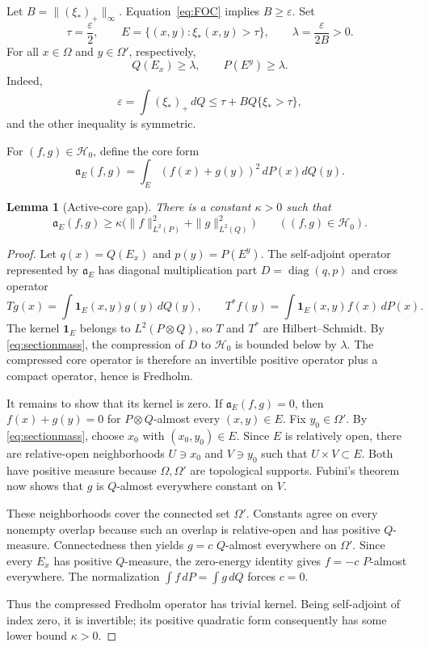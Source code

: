 \documentclass[11pt]{article}
\newtheorem{lemma}[theorem]{Lemma}
\newcommand{\cH}{\mathcal{H}}
\newcommand{\eps}{\varepsilon}
\newcommand{\1}{\mathbf{1}}
\begin{document}
Let $B=\|(\xi_*)_+\|_\infty$.  Equation~\eqref{eq:FOC} implies $B\ge\eps$.
Set
\[
 \tau=\frac\eps2,\qquad
 E=\{(x,y):\xi_*(x,y)>\tau\},\qquad
 \lambda=\frac{\eps}{2B}>0.
\]
For all $x\in\Omega$ and $y\in\Omega'$, respectively,
\begin{equation}
\label{eq:sectionmass}
 Q(E_x)\ge\lambda,\qquad P(E^y)\ge\lambda.
\end{equation}
Indeed,
\[
 \eps=\int(\xi_*)_+\,dQ
 \le \tau+BQ\{\xi_*>\tau\},
\]
and the other inequality is symmetric.

For $(f,g)\in\cH_0$, define the core form
\[
 \mathfrak a_E(f,g)=\int_E(f(x)+g(y))^2\,dP(x)dQ(y).
\]

\begin{lemma}[Active-core gap]
\label{lem:gap}
There is a constant $\kappa>0$ such that
\[
 \mathfrak a_E(f,g)\ge
 \kappa\bigl(\|f\|_{L^2(P)}^2+\|g\|_{L^2(Q)}^2\bigr)
 \qquad((f,g)\in\cH_0).
\]
\end{lemma}

\begin{proof}
Let $q(x)=Q(E_x)$ and $p(y)=P(E^y)$.  The self-adjoint operator represented by
$\mathfrak a_E$ has diagonal multiplication part
$D=\operatorname{diag}(q,p)$ and cross operator
\[
 Tg(x)=\int\1_E(x,y)g(y)\,dQ(y),\qquad T^*f(y)=\int\1_E(x,y)f(x)\,dP(x).
\]
The kernel $\1_E$ belongs to $L^2(P\otimes Q)$, so $T$ and $T^*$ are
Hilbert--Schmidt.  By \eqref{eq:sectionmass}, the compression of $D$ to
$\cH_0$ is bounded below by $\lambda$.  The compressed core operator is
therefore an invertible positive operator plus a compact operator, hence is
Fredholm.

It remains to show that its kernel is zero.  If $\mathfrak a_E(f,g)=0$, then
$f(x)+g(y)=0$ for $P\otimes Q$-almost every $(x,y)\in E$.  Fix
$y_0\in\Omega'$.  By \eqref{eq:sectionmass}, choose $x_0$ with
$(x_0,y_0)\in E$.  Since $E$ is relatively open, there are relative-open
neighborhoods $U\ni x_0$ and $V\ni y_0$ such that $U\times V\subset E$.
Both have positive measure because $\Omega,\Omega'$ are topological supports.
Fubini's theorem now shows that $g$ is $Q$-almost everywhere constant on $V$.

These neighborhoods cover the connected set $\Omega'$.  Constants agree on
every nonempty overlap because such an overlap is relative-open and has
positive $Q$-measure.  Connectedness then yields $g=c$ $Q$-almost everywhere
on $\Omega'$.  Since every $E_x$ has positive $Q$-measure, the zero-energy
identity gives $f=-c$ $P$-almost everywhere.  The normalization
$\int f\,dP=\int g\,dQ$ forces $c=0$.

Thus the compressed Fredholm operator has trivial kernel.  Being self-adjoint
of index zero, it is invertible; its positive quadratic form consequently has
some lower bound $\kappa>0$.
\end{proof}
\end{document}

